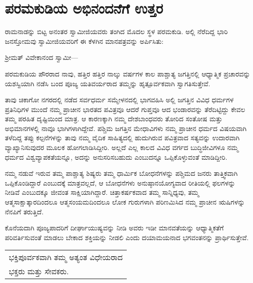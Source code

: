 
\chapter{ಪರಮಕುಡಿಯ ಅಭಿನಂದನೆಗೆ ಉತ್ತರ}

ರಾಮನಾಡನ್ನು ಬಿಟ್ಟ ಅನಂತರ ಸ್ವಾಮೀಜಿಯವರು ತಂಗಿದ ಮೊದಲ ಸ್ಥಳ ಪರಮಕುಡಿ. ಅಲ್ಲಿ ನೆರೆದಿದ್ದ ಭಾರಿ ಜನಸ್ತೋಮವು ಸ್ವಾಮೀಜಿಯವರಿಗೆ ಈ ಕೆಳಗಿನ ಮಾನಪತ್ರವನ್ನು ಅರ್ಪಿಸಿತು:

\smallskip

ಶ‍್ರೀಮತ್​ ವಿವೇಕಾನಂದ ಸ್ವಾಮೀ—

\smallskip

ಪರಮಕುಡಿಯ ಪೌರರಾದ ನಾವು, ಹತ್ತಿರ ಹತ್ತಿರ ನಾಲ್ಕು ವರ್ಷಗಳ ಕಾಲ ಪಾಶ್ಚಾತ್ಯ ಜಗತ್ತಿನಲ್ಲಿ ಆಧ್ಯಾತ್ಮಿಕ ಪ್ರಚಾರವನ್ನು ಯಶಸ್ವಿಯಾಗಿ ನಡೆಸಿ ಬಂದ ಪೂಜ್ಯ ಯತಿವರ್ಯರಾದ ತಮ್ಮನ್ನು ಹೃತ್ಪೂರ್ವಕವಾಗಿ ಸ್ವಾಗತಿಸುತ್ತೇವೆ.

\smallskip

ತಾವು ಚಿಕಾಗೋ ನಗರದಲ್ಲಿ ನಡೆದ ಸರ್ವಧರ್ಮ ಸಮ್ಮೇಳನದಲ್ಲಿ ಭಾಗವಹಿಸಿ ಅಲ್ಲಿ ಜಗತ್ತಿನ ವಿವಿಧ ಧರ್ಮಗಳ ಪ್ರತಿನಿಧಿಗಳ ಮುಂದೆ ನಮ್ಮ ಪ್ರಾಚೀನ ಭಾರತದ ಪವಿತ್ರವೂ ಆದರೆ ಗುಪ್ತವೂ ಆದ ಭಂಡಾರವನ್ನು ತೆರೆದಿಟ್ಟಿದ್ದು ಕೇವಲ ತಮ್ಮ ಪರಹಿತ ದೃಷ್ಟಿಯಿಂದ ಮಾತ್ರ. ಆ ಕಾರಣಕ್ಕಾಗಿ ನಮ್ಮ ದೇಶಬಾಂಧವರು ತೋರಿದ ಸಂತೋಷ ಮತ್ತು ಅಭಿಮಾನಗಳಲ್ಲಿ ನಾವೂ ಭಾಗಿಗಳಾಗಿದ್ದೇವೆ. ಪಶ್ಚಿಮ ಜಗತ್ತಿನ ಮೇಧಾವಿಗಳು ನಮ್ಮ ಪ್ರಾಚೀನ ಧರ್ಮದ ವಿಷಯವಾಗಿ ತಳೆದಿದ್ದ ತಪ್ಪು ಕಲ್ಪನೆಗಳನ್ನು ತಾವು ನಮ್ಮ ವೈದಿಕ ಸಾಹಿತ್ಯದಲ್ಲಿ ಹುದುಗಿರುವ ಪವಿತ್ರವಾದ ಸತ್ಯವನ್ನು ಉದಾರವಾಗಿ ವ್ಯಾಖ್ಯಾನಿಸುವುದರ ಮೂಲಕ ಹೋಗಲಾಡಿಸಿದ್ದೀರಿ. ಅಲ್ಲದೆ ಎಲ್ಲ ಕಾಲದ ವಿವಿಧ ವರ್ಗದ ಬುದ್ಧಿಜೀವಿಗಳೂ ನಮ್ಮ ಧರ್ಮದ ವಿಶ್ವವ್ಯಾಪಕತೆಯನ್ನೂ, ಅದನ್ನು ಅನುಸರಿಸಬಹುದು ಎಂಬುದನ್ನೂ ಒಪ್ಪಿಕೊಳ್ಳುವಂತೆ ಮಾಡಿದ್ದೀರಿ.

\smallskip

ನಮ್ಮ ನಡುವೆ ಇರುವ ತಮ್ಮ ಪಾಶ್ಚಾತ್ಯ ಶಿಷ್ಯರು ತಮ್ಮ ಧಾರ್ಮಿಕ ಬೋಧನೆಗಳನ್ನು ಪಶ್ಚಿಮದ ಜನರು ತಾತ್ತ್ವಿಕವಾಗಿ ಒಪ್ಪಿಕೊಂಡಿದ್ದಾರೆ ಎಂಬುದಕ್ಕೆ ಮಾತ್ರವಲ್ಲದೆ, ಆ ಬೋಧನೆಗಳು ಅನುಷ್ಠಾನಯೋಗ್ಯವಾದ ರೀತಿಯಲ್ಲಿ ಫಲಗಳನ್ನು ನೀಡಿವೆ ಎಂಬುದಕ್ಕೂ ಜೀವಂತ ಸಾಕ್ಷಿಯಾಗಿದ್ದಾರೆ. ಚಿತ್ತಾಕರ್ಷಕವಾದ ತಮ್ಮ ಸಾನ್ನಿಧ್ಯವು, ತಮ್ಮ ಆತ್ಮಸಾಕ್ಷಾತ್ಕಾರದಿಂದಲೂ ಆತ್ಮಸಂಯಮದಿಂದಲೂ ಲೋಕ ಗುರುಗಳಾಗಿ ಪರಿಣಮಿಸಿದ ನಮ್ಮ ಪ್ರಾಚೀನ ಋಷಿಗಳನ್ನು ನೆನಪಿಗೆ ತರುತ್ತಿದೆ.

\smallskip

ಕೊನೆಯದಾಗಿ ಪೂಜ್ಯಪಾದರಿಗೆ ದೀರ್ಘಾಯುಷ್ಯವನ್ನು ನೀಡಿ ಅವರು ಇಡೀ ಮಾನವತೆಯನ್ನು ಆಧ್ಯಾತ್ಮಿಕತೆಗೆ ಪರಿವರ್ತಿಸುವಂತೆ ಮಾಡಲು ಬೇಕಾದ ಶಕ್ತಿಯನ್ನು ನೀಡಲಿ ಎಂದು ದಯಾಮಯನಾದ ಭಗವಂತನನ್ನು ಪ್ರಾರ್ಥಿಸುತ್ತೇವೆ.

\smallskip

\begin{longtable}[r]{@{}l@{}}
ಭಕ್ತಿಪೂರ್ವಕವಾಗಿ ತಮ್ಮ ಅತ್ಯಂತ ವಿಧೇಯರಾದ \\
ಭಕ್ತರು ಮತ್ತು ಸೇವಕರು. \\
\end{longtable}

\eject

